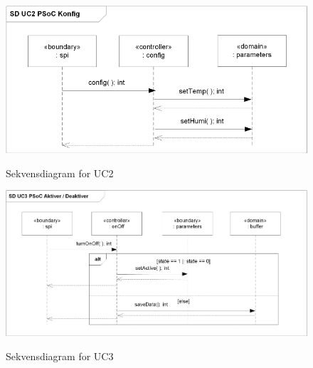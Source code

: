 \begin{figure}[htbp] \centering
{\includegraphics[scale=1]{filer/design/a_psoc_uc2}}
\caption{Sekvensdiagram for UC2}
\label{fig:psoc_sd_uc2}
\end{figure} 

\begin{figure}[htbp] \centering
{\includegraphics[scale=1]{filer/design/a_psoc_uc3}}
\caption{Sekvensdiagram for UC3}
\label{fig:psoc_sd_uc3}
\end{figure} 

